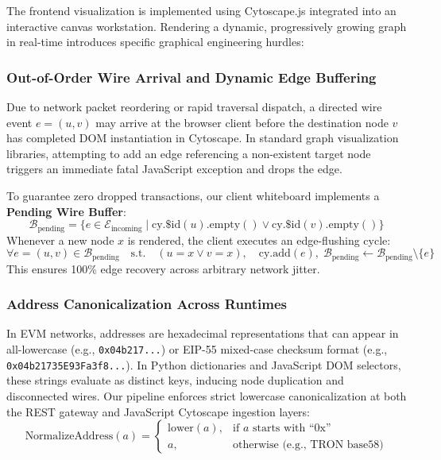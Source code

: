 The frontend visualization is implemented using Cytoscape.js integrated into an interactive canvas workstation. Rendering a dynamic, progressively growing graph in real-time introduces specific graphical engineering hurdles:

\subsubsection{Out-of-Order Wire Arrival and Dynamic Edge Buffering}
Due to network packet reordering or rapid traversal dispatch, a directed wire event $e = (u, v)$ may arrive at the browser client before the destination node $v$ has completed DOM instantiation in Cytoscape. In standard graph visualization libraries, attempting to add an edge referencing a non-existent target node triggers an immediate fatal JavaScript exception and drops the edge.

To guarantee zero dropped transactions, our client whiteboard implements a \textbf{Pending Wire Buffer}:
\begin{equation}
    \mathcal{B}_{\text{pending}} = \{e \in \mathcal{E}_{\text{incoming}} \mid \text{cy.\$id}(u).\text{empty}() \lor \text{cy.\$id}(v).\text{empty}()\}
\end{equation}
Whenever a new node $x$ is rendered, the client executes an edge-flushing cycle:
\begin{equation}
    \forall e = (u, v) \in \mathcal{B}_{\text{pending}} \quad \text{s.t.} \quad (u = x \lor v = x), \quad \text{cy.add}(e), \; \mathcal{B}_{\text{pending}} \gets \mathcal{B}_{\text{pending}} \setminus \{e\}
\end{equation}
This ensures 100\% edge recovery across arbitrary network jitter.

\subsubsection{Address Canonicalization Across Runtimes}
In EVM networks, addresses are hexadecimal representations that can appear in all-lowercase (e.g., \texttt{0x04b217...}) or EIP-55 mixed-case checksum format (e.g., \texttt{0x04b21735E93Fa3f8...}). In Python dictionaries and JavaScript DOM selectors, these strings evaluate as distinct keys, inducing node duplication and disconnected wires. Our pipeline enforces strict lowercase canonicalization at both the REST gateway and JavaScript Cytoscape ingestion layers:
\begin{equation}
    \text{NormalizeAddress}(a) = \begin{cases}
    \text{lower}(a), & \text{if } a \text{ starts with } \text{``0x''} \\
    a, & \text{otherwise (e.g., TRON base58)}
    \end{cases}
\end{equation}

